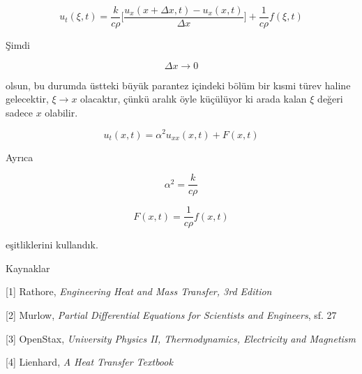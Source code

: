 \documentclass[12pt,fleqn]{article}\usepackage{../../common}
\begin{document}
$$
u_t(\xi,t) =  \frac{k}{c\rho}
\bigg[
\frac{u_x(x+\Delta x,t) - u_x(x,t)} {\Delta x}
\bigg]
+ \frac{ 1}{c\rho}f(\xi,t)
$$

Şimdi 

$$ \Delta x \to 0 $$

olsun, bu durumda üstteki büyük parantez içindeki bölüm bir kısmi türev
haline gelecektir, $\xi \to x$ olacaktır, çünkü aralık öyle küçülüyor ki
arada kalan $\xi$ değeri sadece $x$ olabilir.

$$ u_t(x,t) = \alpha^2u_{xx}(x,t) + F(x,t) $$

Ayrıca

$$ \alpha^2 = \frac{k}{c\rho} $$

$$ F(x,t) = \frac{1}{c\rho}f(x,t) $$

eşitliklerini kullandık.



Kaynaklar

[1] Rathore, {\em Engineering Heat and Mass Transfer, 3rd Edition}

[2] Murlow, {\em Partial Differential Equations for Scientists and Engineers}, sf. 27

[3] OpenStax, {\em University Physics II, Thermodynamics, Electricity and Magnetism}

[4] Lienhard, {\em A Heat Transfer Textbook}
\end{document}
